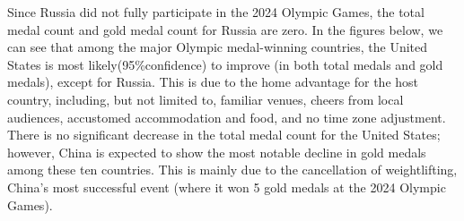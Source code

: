 \documentclass{mcmthesis}  %
\begin{document}
Since Russia did not fully participate in the 2024 Olympic Games, the total medal count and gold medal count for Russia are zero. In the figures below, we can see that among the major Olympic medal-winning countries, the United States is most likely(95\%confidence) to improve (in both total medals and gold medals), except for Russia. This is due to the home advantage for the host country, including, but not limited to, familiar venues, cheers from local audiences, accustomed accommodation and food, and no time zone adjustment. There is no significant decrease in the total medal count for the United States; however, China is expected to show the most notable decline in gold medals among these ten countries. This is mainly due to the cancellation of weightlifting, China's most successful event (where it won 5 gold medals at the 2024 Olympic Games).
\end{document}
